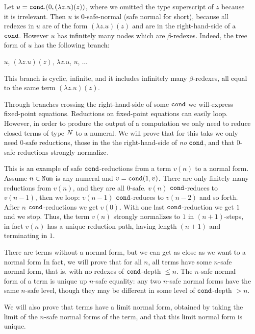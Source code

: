 
\begin{Eg}
Let $u = {\tt cond}. (0, (\lambda z.u)(z) )$, where we omitted the type superscript
of $z$ because it is irrelevant. Then $u$ is $0$-safe-normal (safe normal for short), because
all redexes in $u$ are of the form  $(\lambda z.u)(z)$ and are in the right-hand-side of a ${\tt cond}$. 
However $u$ has infinitely many nodes which are $\beta$-redexes. 
Indeed, the tree form of $u$ has the following branch:
\begin{center}
  $u$, 
  \quad
  $(\lambda z.u)(z)$, 
  \quad
  $\lambda z.u$, 
 \quad
  $u$, 
 \quad $\ldots$
\end{center}
This branch is cyclic, infinite,
and it includes infinitely many $\beta$-redexes, all equal to the same term $(\lambda z.u)(z)$.
\end{Eg}

Through branches crossing the right-hand-side
of some ${\tt cond}$ we will-express fixed-point equations.
Reductions on fixed-point equations can easily loop.
However, in order to produre the output of a computation we only need 
to reduce closed terms of type ${N}$ to a numeral. We will prove that for this taks we only
need $0$-safe reductions, those in the the right-hand-side
of \emph{no} ${\tt cond}$, and that $0$-safe reductions strongly normalize. 

\begin{Eg}
This is an example of safe ${\tt cond}$-reductions from a term $v(n)$ to a normal form. 
Assume $n \in {\tt Num}$ is any numeral and $v = {\tt cond}(1, v)$. There are only finitely many reductions
from $v(n)$, and they are all $0$-safe. $v(n)$ ${\tt cond}$-reduces to $v(n-1)$, 
then we loop: $v(n-1)$ ${\tt cond}$-reduces to $v(n-2)$ and so forth.
After $n$ ${\tt cond}$-reductions we get $v(0)$. With one last ${\tt cond}$-reduction we get $1$ and we stop. 
Thus, the term $v(n)$ strongly normalizes to $1$ in $(n+1)$-steps, in fact $v(n)$ has a unique reduction path,
having length $(n+1)$ and terminating in $1$.
\end{Eg}

There are terms without a normal form, but we can get as close as we want to a normal form
In fact, we will prove that for all $n$, all terms have some $n$-safe normal form, that is, 
with no redexes of ${\tt cond}$-depth $\le n$. 
The $n$-safe normal form of a term is unique up $n$-safe equality: any two $n$-safe normal forms have the same $n$-safe level, though they may be different in some level of ${\tt cond}$-depth $>n$.

We will also prove that terms have a limit normal form, 
obtained by taking the limit of the $n$-safe normal forms of the term, and that this limit normal form is unique.
